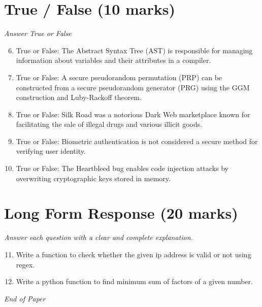 \documentclass[12pt]{article}
\begin{document}
\section*{True / False (10 marks)}
\textit{Answer True or False}
\begin{enumerate}[label=\arabic*.]
\setcounter{enumi}{5}
\item True or False: The Abstract Syntax Tree (AST) is responsible for managing information about variables and their attributes in a compiler.
\item True or False: A secure pseudorandom permutation (PRP) can be constructed from a secure pseudorandom generator (PRG) using the GGM construction and Luby-Rackoff theorem.
\item True or False: Silk Road was a notorious Dark Web marketplace known for facilitating the sale of illegal drugs and various illicit goods.
\item True or False: Biometric authentication is not considered a secure method for verifying user identity.
\item True or False: The Heartbleed bug enables code injection attacks by overwriting cryptographic keys stored in memory.
\end{enumerate}

\section*{Long Form Response (20 marks)}
\textit{Answer each question with a clear and complete explanation.}
\begin{enumerate}[label=\arabic*.]
\setcounter{enumi}{10}
\item Write a function to check whether the given ip address is valid or not using regex.
\item Write a python function to find minimum sum of factors of a given number.
\end{enumerate}

\vfill
\noindent\textit{End of Paper}
\end{document}
